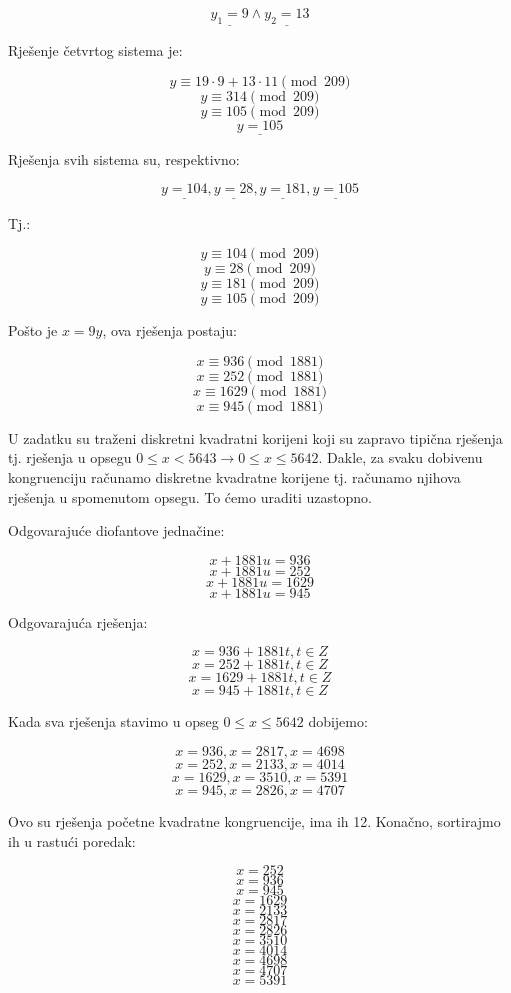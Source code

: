 \documentclass[12pt]{article}
\begin{document}
$$\underline{y_{1} = 9} \land \underline{y_{2} = 13}$$\vspace{1mm}

Rješenje četvrtog sistema je:

$$y \equiv 19 \cdot 9 + 13 \cdot 11 \pmod{209}$$
$$y \equiv 314 \pmod{209}$$
$$y \equiv 105 \pmod{209}$$
$$\underline{y = 105}$$\vspace{1mm}

Rješenja svih sistema su, respektivno:

$$\underline{y = 104}, \underline{y = 28}, \underline{y = 181}, \underline{y = 105}$$\vspace{1mm}

Tj.:

$$y \equiv 104 \pmod{209}$$
$$y \equiv 28 \pmod{209}$$
$$y \equiv 181 \pmod{209}$$
$$y \equiv 105 \pmod{209}$$\vspace{1mm}

Pošto je $x = 9y$, ova rješenja postaju:

$$x \equiv 936 \pmod{1881}$$
$$x \equiv 252 \pmod{1881}$$
$$x \equiv 1629 \pmod{1881}$$
$$x \equiv 945 \pmod{1881}$$\vspace{1mm}

U zadatku su traženi diskretni kvadratni korijeni koji su zapravo tipična rješenja tj. rješenja u opsegu $0 \leq x < 5643 \to 0 \leq x \leq 5642$. Dakle, za svaku dobivenu kongruenciju računamo diskretne kvadratne korijene tj. računamo njihova rješenja u spomenutom opsegu. To ćemo uraditi uzastopno.

Odgovarajuće diofantove jednačine:

$$x + 1881u = 936$$
$$x + 1881u = 252$$
$$x + 1881u = 1629$$
$$x + 1881u = 945$$\vspace{1mm}

Odgovarajuća rješenja:

$$x = 936 + 1881t, t \in Z$$
$$x = 252 + 1881t, t \in Z$$
$$x = 1629 + 1881t, t \in Z$$
$$x = 945 + 1881t, t \in Z$$\vspace{1mm}

Kada sva rješenja stavimo u opseg $0 \leq x \leq 5642$ dobijemo:

$$x = 936, x = 2817, x = 4698$$
$$x = 252, x = 2133, x = 4014$$
$$x = 1629, x = 3510, x = 5391$$
$$x = 945, x = 2826, x = 4707$$\vspace{1mm}

Ovo su rješenja početne kvadratne kongruencije, ima ih 12. Konačno, sortirajmo ih u rastući poredak:

$$x = 252$$
$$x = 936$$
$$x = 945$$
$$x = 1629$$
$$x = 2133$$
$$x = 2817$$
$$x = 2826$$
$$x = 3510$$
$$x = 4014$$
$$x = 4698$$
$$x = 4707$$
$$x = 5391$$\vspace{1mm}
\end{document}

